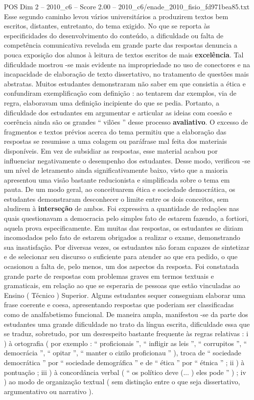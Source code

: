 \begin{textsample}{POS Dim 2 – 2010\_c6 – Score 2.00 – 2010\_c6/enade\_2010\_fisio\_fd971bea85.txt}
Esse segundo caminho levou vários universitários a produzirem textos bem escritos, distantes, entretanto, do tema exigido.
No que se reporta às especificidades do desenvolvimento do conteúdo, a dificuldade ou falta de competência comunicativa revelada em grande parte das respostas denuncia a pouca exposição dos alunos à leitura de textos escritos de mais \textbf{excelência}.
Tal dificuldade mostrou -se mais evidente na impropriedade no uso de conectores e na incapacidade de elaboração de texto dissertativo, no tratamento de questões mais abstratas.
Muitos estudantes demonstraram não saber em que consistia a ética e confundiram exemplificação com definição : ao tentarem dar exemplos, via de regra, elaboravam uma definição incipiente do que se pedia.
Portanto, a dificuldade dos estudantes em argumentar e articular as ideias com coesão e coerência ainda são os grandes “ vilões ” desse processo \textbf{avaliativo}.
O excesso de fragmentos e textos prévios acerca do tema permitiu que a elaboração das respostas se resumisse a uma colagem ou paráfrase mal feita dos materiais disponíveis.
Em vez de subsidiar as respostas, esse material acabou por influenciar negativamente o desempenho dos estudantes.
Desse modo, verificou -se um nível de letramento ainda significativamente baixo, visto que a maioria apresentou uma visão bastante reducionista e simplificada sobre o tema em pauta.
De um modo geral, ao conceituarem ética e sociedade democrática, os estudantes demonstraram desconhecer o limite entre os dois conceitos, sem aludirem à \textbf{interseção} de ambos.
Foi expressiva a quantidade de redações nas quais questionavam a democracia pelo simples fato de estarem fazendo, a fortiori, aquela prova especificamente.
Em muitas das respostas, os estudantes se diziam incomodados pelo fato de estarem obrigados a realizar o exame, demonstrando sua insatisfação.
Por diversas vezes, os estudantes não foram capazes de sintetizar e de selecionar seu discurso o suficiente para atender ao que era pedido, o que ocasionou a falta de, pelo menos, um dos aspectos da resposta.
Foi constatada grande parte de respostas com problemas graves em termos textuais e gramaticais, em relação ao que se esperaria de pessoas que estão vinculadas ao Ensino ( Técnico ) Superior.
Alguns estudantes sequer conseguiam elaborar uma frase coerente e coesa, apresentando respostas que poderiam ser classificadas como de analfabetismo funcional.
De maneira ampla, manifestou -se da parte dos estudantes uma grande dificuldade no trato da língua escrita, dificuldade essa que se traduz, sobretudo, por um desrespeito bastante frequente às regras relativas : i ) à ortografia ( por exemplo : “ proficionais ”, “ infligir as leis ”, “ corrupitos ”, “ democrácia ”, “ opitar ”, “ manter o cizilo proficionau ” ), troca de “ sociedade democrática ” por “ sociedade demográfica ” e de “ ética ” por “ étnica ” ; ii ) à pontuação ; iii ) à concordância verbal ( “ os político deve (... ) eles pode ” ) ; iv ) ao modo de organização textual ( sem distinção entre o que seja dissertativo, argumentativo ou narrativo ).

\end{textsample}
